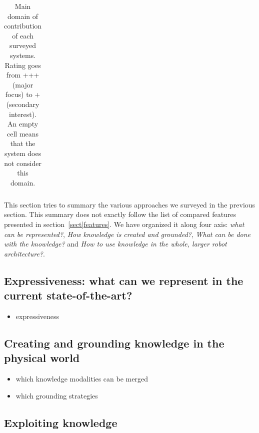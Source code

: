 \documentclass[a4paper, twocolumn]{article}
\begin{document}
\begin{landscape}
\begin{table}
\begin{center}
\begin{tabular}{cp{4.5cm}p{2.3cm}p{2cm}p{1cm}p{1cm}p{1cm}p{1cm}p{1.5cm}p{2cm}p{1.5cm}p{1.5cm}}
\bottomrule

\end{tabular}
\end{center}
\caption{Main domain of contribution of each surveyed systems. Rating goes from +++ (major focus) to + (secondary interest). An empty cell means that 
the system does not consider this domain.}
\label{table|contribution-by-systems}
\end{table}
\end{landscape}

This section tries to summary the various approaches we surveyed in the
previous section.  This summary does not exactly follow the list of compared
features presented in section~\ref{sect|features}. We have organized
it along four axis: \emph{what can be represented?}, \emph{How knowledge is
created and grounded?}, \emph{What can be done with the knowledge?} and
\emph{How to use knowledge in the whole, larger robot architecture?}.

\subsection{Expressiveness: what can we represent in the current state-of-the-art?}
\label{sect|summary-expressiveness}

\begin{itemize}
	\item expressiveness
\end{itemize}


\subsection{Creating and grounding knowledge in the physical world}
\label{sect|summary-grounding}


\begin{itemize}
	\item which knowledge modalities can be merged
	\item which grounding strategies
\end{itemize}


\subsection{Exploiting knowledge}
\label{sect|summary-knowledge-sources-reasoning}
\end{document}

